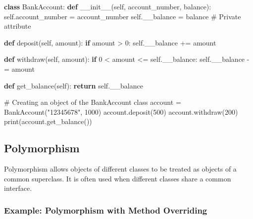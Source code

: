 \documentclass[
  letterpaper,
  DIV=11,
  numbers=noendperiod]{scrreprt}
\newenvironment{Shaded}{\begin{snugshade}}{\end{snugshade}}
\newcommand{\BuiltInTok}[1]{\textcolor[rgb]{0.00,0.23,0.31}{#1}}
\newcommand{\CommentTok}[1]{\textcolor[rgb]{0.37,0.37,0.37}{#1}}
\newcommand{\ControlFlowTok}[1]{\textcolor[rgb]{0.00,0.23,0.31}{\textbf{#1}}}
\newcommand{\DecValTok}[1]{\textcolor[rgb]{0.68,0.00,0.00}{#1}}
\newcommand{\FunctionTok}[1]{\textcolor[rgb]{0.28,0.35,0.67}{#1}}
\newcommand{\KeywordTok}[1]{\textcolor[rgb]{0.00,0.23,0.31}{\textbf{#1}}}
\newcommand{\NormalTok}[1]{\textcolor[rgb]{0.00,0.23,0.31}{#1}}
\newcommand{\OperatorTok}[1]{\textcolor[rgb]{0.37,0.37,0.37}{#1}}
\newcommand{\StringTok}[1]{\textcolor[rgb]{0.13,0.47,0.30}{#1}}
\newcommand{\VariableTok}[1]{\textcolor[rgb]{0.07,0.07,0.07}{#1}}
\begin{document}
\begin{Shaded}
\begin{Highlighting}[]
\KeywordTok{class}\NormalTok{ BankAccount:}
    \KeywordTok{def} \FunctionTok{\_\_init\_\_}\NormalTok{(}\VariableTok{self}\NormalTok{, account\_number, balance):}
        \VariableTok{self}\NormalTok{.account\_number }\OperatorTok{=}\NormalTok{ account\_number}
        \VariableTok{self}\NormalTok{.\_\_balance }\OperatorTok{=}\NormalTok{ balance  }\CommentTok{\# Private attribute}
    
    \KeywordTok{def}\NormalTok{ deposit(}\VariableTok{self}\NormalTok{, amount):}
        \ControlFlowTok{if}\NormalTok{ amount }\OperatorTok{\textgreater{}} \DecValTok{0}\NormalTok{:}
            \VariableTok{self}\NormalTok{.\_\_balance }\OperatorTok{+=}\NormalTok{ amount}
    
    \KeywordTok{def}\NormalTok{ withdraw(}\VariableTok{self}\NormalTok{, amount):}
        \ControlFlowTok{if} \DecValTok{0} \OperatorTok{\textless{}}\NormalTok{ amount }\OperatorTok{\textless{}=} \VariableTok{self}\NormalTok{.\_\_balance:}
            \VariableTok{self}\NormalTok{.\_\_balance }\OperatorTok{{-}=}\NormalTok{ amount}
    
    \KeywordTok{def}\NormalTok{ get\_balance(}\VariableTok{self}\NormalTok{):}
        \ControlFlowTok{return} \VariableTok{self}\NormalTok{.\_\_balance}

\CommentTok{\# Creating an object of the BankAccount class}
\NormalTok{account }\OperatorTok{=}\NormalTok{ BankAccount(}\StringTok{"12345678"}\NormalTok{, }\DecValTok{1000}\NormalTok{)}
\NormalTok{account.deposit(}\DecValTok{500}\NormalTok{)}
\NormalTok{account.withdraw(}\DecValTok{200}\NormalTok{)}
\BuiltInTok{print}\NormalTok{(account.get\_balance())  }
\end{Highlighting}
\end{Shaded}

\subsection{Polymorphism}\label{polymorphism}

Polymorphism allows objects of different classes to be treated as
objects of a common superclass. It is often used when different classes
share a common interface.

\subsubsection{Example: Polymorphism with Method
Overriding}\label{example-polymorphism-with-method-overriding}
\end{document}
